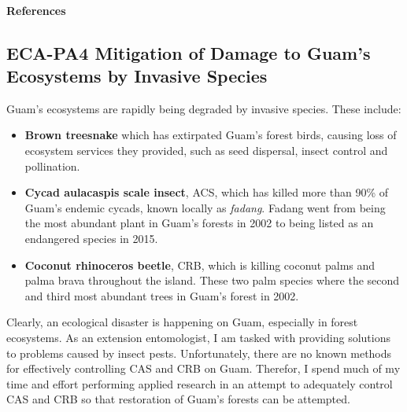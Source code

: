 \begin{refsection}
\begin{comment}
\paragraph{Plans for 15JUN2022-14JUN2023}

With the limited space problem partially solved, I intend to re-established the UOG insect collection internship to train entomology students how to curate an institutional insect collection.
The current focus will be on adding specimen images to the online database.
\end{comment}
\paragraph{References}
\printbibliography[heading=none]
\end{refsection}

\subsection{ECA-PA4 Mitigation of Damage to Guam's Ecosystems by Invasive Species}

Guam's ecosystems are rapidly being degraded by invasive species. These include:
\begin{itemize}
	\item \textbf{Brown treesnake} which has extirpated Guam's forest birds, causing loss of ecosystem services they provided, such as seed dispersal, insect control and pollination.
	\item \textbf{Cycad aulacaspis scale insect}, ACS, which has killed more than 90\% of Guam's endemic cycads, known locally as \textit{fadang}. Fadang went from being the most abundant plant in Guam's forests in 2002 to being listed as an endangered species in 2015.
	\item \textbf{Coconut rhinoceros beetle}, CRB, which is killing coconut palms and palma brava throughout the island. These two palm species where the second and third most abundant trees in Guam's forest in 2002. 
\end{itemize}

Clearly, an ecological disaster is happening on Guam, especially in forest ecosystems. As an extension entomologist, I am tasked with providing solutions to problems caused by insect pests. Unfortunately, there are no known methods for effectively controlling CAS and CRB on Guam. Therefor, I spend much of my time and effort performing applied research in an attempt to adequately control CAS and CRB so that restoration of Guam's forests can be attempted. 


